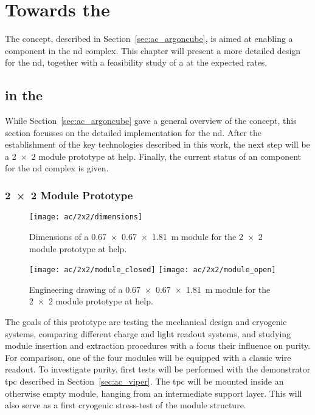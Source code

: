 \chapter{Towards the  }
\label{chap:dune-nd}

The \AC{} concept, described in Section~\ref{sec:ac_argoncube}, is aimed at enabling a \lartpc{} component in the \dune{} \gls{nd} complex.
This chapter will present a more detailed design for the \gls{nd}, together with a feasibility study of a \lartpc{} at the expected rates.


\section{\AC{} in the  }
\label{sec:dune-nd_ac}

While Section~\ref{sec:ac_argoncube} gave a general overview of the \AC{} concept, this section focusses on the detailed implementation for the \dune{} \gls{nd}.
After the establishment of the key technologies described in this work, the next step will be a \num{2 x 2} module prototype at \gls{help}.
Finally, the current status of an \AC{} \lartpc{} component for the \dune{} \gls{nd} complex is given.

\subsection{\num{2 x 2} Module Prototype}
\label{sec:dune-nd_ac_2x2}

\begin{figure}[htb]
	\centering
	\texttt{[image: ac/2x2/dimensions]}
	\caption[\AC{} \num{2 x 2} prototype module dimensions]{
		Dimensions of a \SI{0.67 x 0.67 x 1.81}{\metre} module for the \AC{} \num{2 x 2} module \AC{} prototype at \acrshort{help}.
	}
	\label{fig:2x2_dim}
\end{figure}

\begin{figure}[htb]
	\centering
	\texttt{[image: ac/2x2/module\_closed]}
	\texttt{[image: ac/2x2/module\_open]}
	\caption[\AC{} \num{2 x 2} prototype module engineering drawing]{
		Engineering drawing of a \SI{0.67 x 0.67 x 1.81}{\metre} module for the \AC{} \num{2 x 2} module \AC{} prototype at \acrshort{help}.
	}
	\label{fig:2x2_mod}
\end{figure}

The goals of this prototype are testing the mechanical design and cryogenic systems, comparing different charge and light readout systems, and studying module insertion and extraction procedures with a focus their influence on purity.
For comparison, one of the four modules will be equipped with a classic wire readout.
To investigate purity, first tests will be performed with the \AC{} demonstrator \gls{tpc} described in Section~\ref{sec:ac_viper}.
The \gls{tpc} will be mounted inside an otherwise empty module, hanging from an intermediate support layer.
This will also serve as a first cryogenic stress-test of the module structure.

